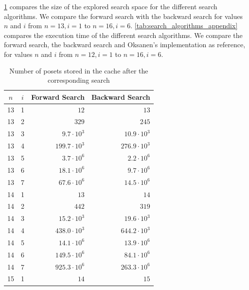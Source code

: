 \documentclass[a4paper,UKenglish,cleveref, autoref, thm-restate, anonymous]{lipics-v2021}
\begin{document}
\cref{tab:cache_entries_appendix} compares the size of the explored search space for the different search algorithms.
We compare the forward search with the backward search for values $n$ and $i$ from $n=13, i=1$ to $n=16,i=6$.
\cref{tab:search_algorithms_appendix} compares the execution time of the different search algorithms.
We compare the forward search, the backward search and Oksanen's implementation as reference, for values $n$ and $i$ from $n=12, i=1$ to $n=16,i=6$.

\begin{table}[!t]
  \renewcommand{\arraystretch}{1.1}
  \caption{Number of posets stored in the cache after the corresponding search}
  \label{tab:cache_entries_appendix}
  \centering
  \small
  \begin{tabular}{c|c|r|r}
    $n$ & $i$ & \textbf{Forward Search} & \textbf{Backward Search} \\
    \hline
    13  & 1   & $12$                    & $13$                     \\
    13  & 2   & $329$                   & $245$                    \\
    13  & 3   & $9.7 \cdot 10^3$        & $10.9 \cdot 10^3$        \\
    13  & 4   & $199.7 \cdot 10^3$      & $276.9 \cdot 10^3$       \\
    13  & 5   & $3.7 \cdot 10^6$        & $2.2 \cdot 10^6$         \\
    13  & 6   & $18.1 \cdot 10^6$       & $9.7 \cdot 10^6$         \\
    13  & 7   & $67.6 \cdot 10^6$       & $14.5 \cdot 10^6$        \\
    \hline
    14  & 1   & $13$                    & $14$                     \\
    14  & 2   & $442$                   & $319$                    \\
    14  & 3   & $15.2 \cdot 10^3$       & $19.6 \cdot 10^3$        \\
    14  & 4   & $438.0 \cdot 10^3$      & $644.2 \cdot 10^3$       \\
    14  & 5   & $14.1 \cdot 10^6$       & $13.9 \cdot 10^6$        \\
    14  & 6   & $149.5 \cdot 10^6$      & $84.1 \cdot 10^6$        \\
    14  & 7   & $925.3 \cdot 10^6$      & $263.3 \cdot 10^6$       \\
    \hline
    15  & 1   & $14$                    & $15$                     \\

\end{tabular}
\end{table}
\end{document}
